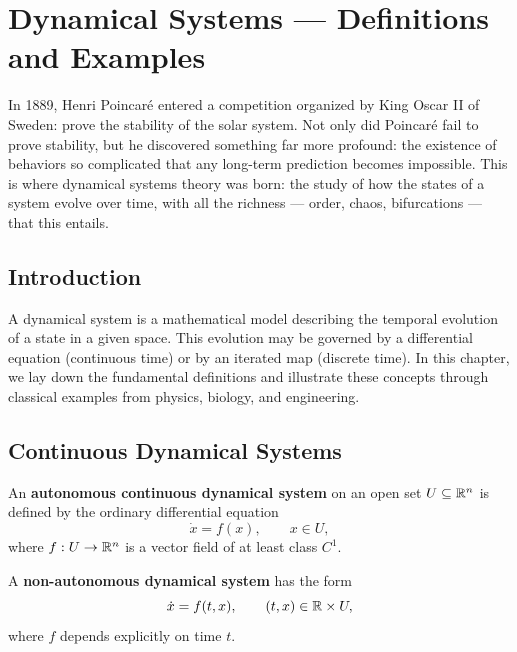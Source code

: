 \chapter{Dynamical Systems --- Definitions and Examples}
\label{ch:definitions}

In 1889, Henri Poincar\'e entered a competition organized by King Oscar II of
Sweden: prove the stability of the solar system. Not only did Poincar\'e fail
to prove stability, but he discovered something far more profound: the
existence of behaviors so complicated that any long-term prediction becomes
impossible. This is where dynamical systems theory was born: the study of
how the states of a system evolve over time, with all the richness --- order,
chaos, bifurcations --- that this entails.

\section{Introduction}

A dynamical system is a mathematical model describing the temporal evolution
of a state in a given space. This evolution may be governed by a differential
equation (continuous time) or by an iterated map (discrete time). In this
chapter, we lay down the fundamental definitions and illustrate these concepts
through classical examples from physics, biology, and engineering.

\section{Continuous Dynamical Systems}

\begin{definition}
An \textbf{autonomous continuous dynamical system} on an open set
$U \subseteq \mathbb{R}^n$ is defined by the ordinary differential equation
\[
    \dot{x} = f(x), \qquad x \in U,
\]
where $f : U \to \mathbb{R}^n$ is a vector field of at least class $C^1$.
\end{definition}

\begin{definition}
A \textbf{non-autonomous dynamical system} has the form
\[
    \dot{x} = f(t, x), \qquad (t, x) \in \mathbb{R} \times U,
\]
where $f$ depends explicitly on time $t$.
\end{definition}

